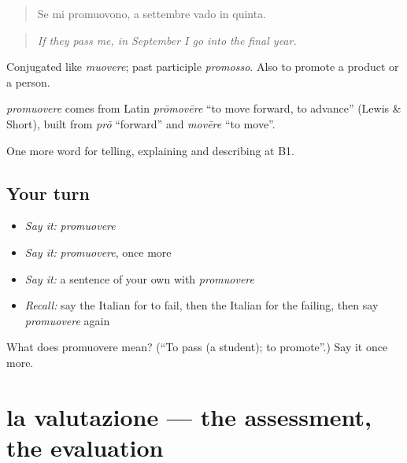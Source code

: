 \begin{quote}
Se mi promuovono, a settembre vado in quinta.
\end{quote}

\begin{quote}
\emph{If they pass me, in September I go into the final year.}
\end{quote}

Conjugated like \emph{muovere}; past participle \emph{promosso}. Also to promote a product or a person.

\begin{cousinweb}
\emph{promuovere} comes from Latin \emph{prōmovēre} \textquotedblleft{}to move forward, to advance\textquotedblright{} (Lewis \& Short), built from \emph{prō} \textquotedblleft{}forward\textquotedblright{} and \emph{movēre} \textquotedblleft{}to move\textquotedblright{}.
\end{cousinweb}

\begin{grammarlens}[title={What you've built}]
One more word for telling, explaining and describing at B1.
\end{grammarlens}

\subsection*{Your turn}
\begin{itemize}
\raggedright
  \item \emph{Say it:} \emph{promuovere}
  \item \emph{Say it:} \emph{promuovere}, once more
  \item \emph{Say it:} a sentence of your own with \emph{promuovere}
  \item \emph{Recall:} say the Italian for to fail, then the Italian for the failing, then say \emph{promuovere} again
\end{itemize}

\begin{tcolorbox}[breakable,colback=teal!4,colframe=teal!35!black,title={Before you move on}]
What does promuovere mean? (\textquotedblleft{}To pass (a student); to promote\textquotedblright{}.) Say it once more.
\end{tcolorbox}
\section[la valutazione]{la valutazione — the assessment, the evaluation}

\label{lesson:IT-C383-valutazione}



